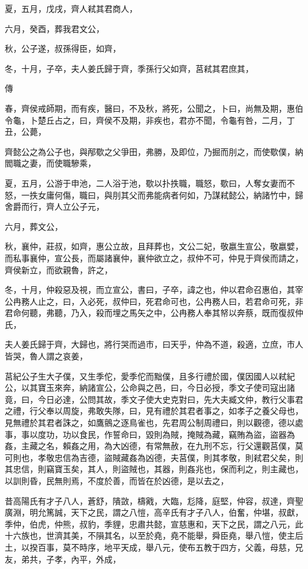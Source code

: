 \documentclass{ctexart}
\begin{document}
夏，五月，戊戌，齊人弒其君商人，

六月，癸酉，葬我君文公，

秋，公子遂，叔孫得臣，如齊，

冬，十月，子卒，夫人姜氏歸于齊，季孫行父如齊，莒弒其君庶其，

傳



春，齊侯戒師期，而有疾，醫曰，不及秋，將死，公聞之，卜曰，尚無及期，惠伯令龜，卜楚丘占之，曰，齊侯不及期，非疾也，君亦不聞，令龜有咎，二月，丁丑，公薨，

齊懿公之為公子也，與邴歜之父爭田，弗勝，及即位，乃掘而刖之，而使歜僕，納閻職之妻，而使職驂乘，

夏，五月，公游于申池，二人浴于池，歜以扑抶職，職怒，歜曰，人奪女妻而不怒，一抶女庸何傷，職曰，與刖其父而弗能病者何如，乃謀弒懿公，納諸竹中，歸舍爵而行，齊人立公子元，

六月，葬文公，

秋，襄仲，莊叔，如齊，惠公立故，且拜葬也，文公二妃，敬嬴生宣公，敬嬴嬖，而私事襄仲，宣公長，而屬諸襄仲，襄仲欲立之，叔仲不可，仲見于齊侯而請之，齊侯新立，而欲親魯，許之，

冬，十月，仲殺惡及視，而立宣公，書曰，子卒，諱之也，仲以君命召惠伯，其宰公冉務人止之，曰，入必死，叔仲曰，死君命可也，公冉務人曰，若君命可死，非君命何聽，弗聽，乃入，殺而埋之馬矢之中，公冉務人奉其帑以奔蔡，既而復叔仲氏，

夫人姜氏歸于齊，大歸也，將行哭而過市，曰天乎，仲為不道，殺適，立庶，市人皆哭，魯人謂之哀姜，

莒紀公子生大子僕，又生季佗，愛季佗而黜僕，且多行禮於國，僕因國人以弒紀公，以其寶玉來奔，納諸宣公，公命與之邑，曰，今日必授，季文子使司寇出諸竟，曰，今日必達，公問其故，季文子使大史克對曰，先大夫臧文仲，教行父事君之禮，行父奉以周旋，弗敢失隊，曰，見有禮於其君者事之，如孝子之養父母也，見無禮於其君者誅之，如鷹鸇之逐鳥雀也，先君周公制周禮曰，則以觀德，德以處事，事以度功，功以食民，作誓命曰，毀則為賊，掩賊為藏，竊賄為盜，盜器為姦，主藏之名，賴姦之用，為大凶德，有常無赦，在九刑不忘，行父還觀莒僕，莫可則也，孝敬忠信為吉德，盜賊藏姦為凶德，夫莒僕，則其孝敬，則弒君父矣，則其忠信，則竊寶玉矣，其人，則盜賊也，其器，則姦兆也，保而利之，則主藏也，以訓則昏，民無則焉，不度於善，而皆在於凶德，是以去之，

昔高陽氏有才子八人，蒼舒，隤敳，檮戭，大臨，尨降，庭堅，仲容，叔達，齊聖廣淵，明允篤誠，天下之民，謂之八愷，高辛氏有才子八人，伯奮，仲堪，叔獻，季仲，伯虎，仲熊，叔豹，季貍，忠肅共懿，宣慈惠和，天下之民，謂之八元，此十六族也，世濟其美，不隕其名，以至於堯，堯不能舉，舜臣堯，舉八愷，使主后土，以揆百事，莫不時序，地平天成，舉八元，使布五教于四方，父義，母慈，兄友，弟共，子孝，內平，外成，
\end{document}
